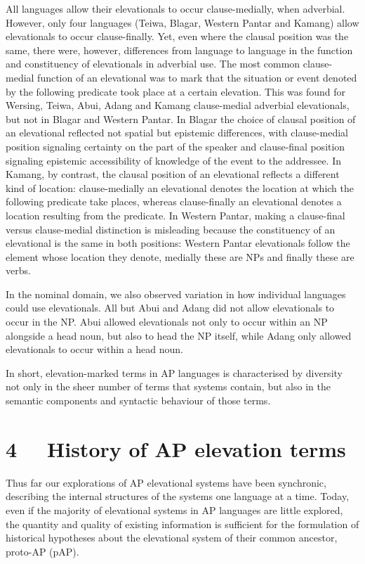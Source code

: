 All languages allow their elevationals to occur clause-medially, when adverbial. However, only four languages (Teiwa, Blagar, Western Pantar and Kamang) allow elevationals to occur clause-finally. Yet, even where the clausal position was the same, there were, however, differences from language to language in the function and constituency of elevationals in adverbial use. The most common clause-medial function of an elevational was to mark that the situation or event denoted by the following predicate took place at a certain elevation. This was found for Wersing, Teiwa, Abui, Adang and Kamang clause-medial adverbial elevationals, but not in Blagar and Western Pantar. In Blagar the choice of clausal position of an elevational reflected not spatial but epistemic differences, with clause-medial position signaling certainty on the part of the speaker and clause-final position signaling epistemic accessibility of knowledge of the event to the addressee. In Kamang, by contrast, the clausal position of an 
elevational reflects a different kind of location: clause-medially an elevational denotes the location at which the following predicate take places, whereas clause-finally an elevational denotes a location resulting from the predicate. In Western Pantar, making a clause-final versus clause{}-medial distinction is misleading because the constituency of an elevational is the same in both positions: Western Pantar elevationals follow the element whose location they denote, medially these are NPs and finally these are verbs. 

In the nominal domain, we also observed variation in how individual languages could use elevationals. All but Abui and Adang did not allow elevationals to occur in the NP. Abui allowed elevationals not only to occur within an NP alongside a head noun, but also to head the NP itself, while Adang only allowed elevationals to occur within a head noun.

In short, elevation-marked terms in AP languages is characterised by diversity not only in the sheer number of terms that systems contain, but also in the semantic components and syntactic behaviour of those terms. 

\section[4 \ \ History of AP elevation terms]{4 \ \ History of AP elevation terms}
Thus far our explorations of AP elevational systems have been synchronic, describing the internal structures of the systems one language at a time. Today, even if the majority of elevational systems in AP languages are little explored, the quantity and quality of existing information is sufficient for the formulation of historical hypotheses about the elevational system of their common ancestor, proto-AP (pAP).

